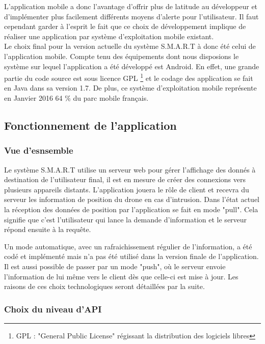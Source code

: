 	 L'application mobile a donc l'avantage d'offrir plus de latitude au développeur et d'implémenter plus facilement différents moyens d'alerte pour l'utilisateur. Il faut cependant garder à l'esprit le fait que ce choix de développement implique de réaliser une application par système d'exploitation mobile existant.
	~\\
	Le choix final pour la version actuelle du système S.M.A.R.T à donc été celui de l'application mobile. Compte tenu des équipements dont nous disposions le système sur lequel l'application a été développé est Android. En effet, une grande partie du code source est sous licence GPL \footnote{GPL : "General Public License" régissant la distribution des logiciels libres} et le codage des application se fait en Java dans sa version 1.7. De plus, ce système d'exploitation mobile représente en Janvier 2016 64 \% du parc mobile français.

\subsection{Fonctionnement de l'application}

\subsubsection{Vue d'esnsemble}

	Le système S.M.A.R.T utilise un serveur web pour gérer l'affichage des donnés à destination de l'utilisateur final, il est en mesure de créer des connexions vers plusieurs appareils distants. L'application jouera le rôle de client et recevra du serveur les information de position du drone en cas d'intrusion. Dans l'état actuel la réception des données de position par l'application se fait en mode "pull". Cela signifie que c'est l'utilisateur qui lance la demande d'information et le serveur répond ensuite à la requête.
	
	Un mode automatique, avec un rafraichissement régulier de l'information, a été codé et implémenté mais n'a pas été utilisé dans la version finale de l'application. Il est aussi possible de passer par un mode "push", où le serveur envoie l'information de lui même vers le client dès que celle-ci est mise à jour. Les raisons de ces choix technologiques seront détaillées par la suite.


\subsubsection{Choix du niveau d'API}

